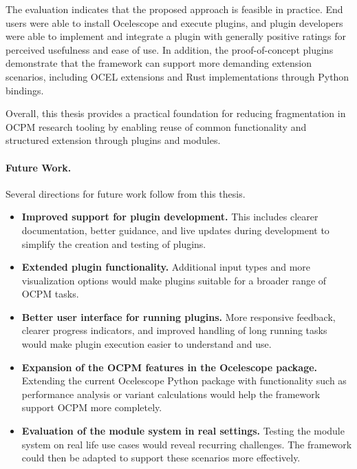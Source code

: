 The evaluation indicates that the proposed approach is feasible in practice.
End users were able to install Ocelescope and execute plugins, and plugin developers were able to implement and integrate a plugin with generally positive ratings for perceived usefulness and ease of use.
In addition, the proof-of-concept plugins demonstrate that the framework can support more demanding extension scenarios, including OCEL extensions and Rust implementations through Python bindings.

Overall, this thesis provides a practical foundation for reducing fragmentation in OCPM research tooling by enabling reuse of common functionality and structured extension through plugins and modules.

\paragraph{Future Work.}

Several directions for future work follow from this thesis.

\begin{itemize}
	\item \textbf{Improved support for plugin development.}
	      This includes clearer documentation, better guidance, and live updates during development to simplify the creation and testing of plugins.

	\item \textbf{Extended plugin functionality.}
	      Additional input types and more visualization options would make plugins suitable for a broader range of OCPM tasks.

	\item \textbf{Better user interface for running plugins.}
	      More responsive feedback, clearer progress indicators, and improved handling of long running tasks would make plugin execution easier to understand and use.

	\item \textbf{Expansion of the OCPM features in the Ocelescope package.}
	      Extending the current Ocelescope Python package with functionality such as performance analysis or variant calculations would help the framework support OCPM more completely.

	\item \textbf{Evaluation of the module system in real settings.}
	      Testing the module system on real life use cases would reveal recurring challenges.
	      The framework could then be adapted to support these scenarios more effectively.
\end{itemize}
